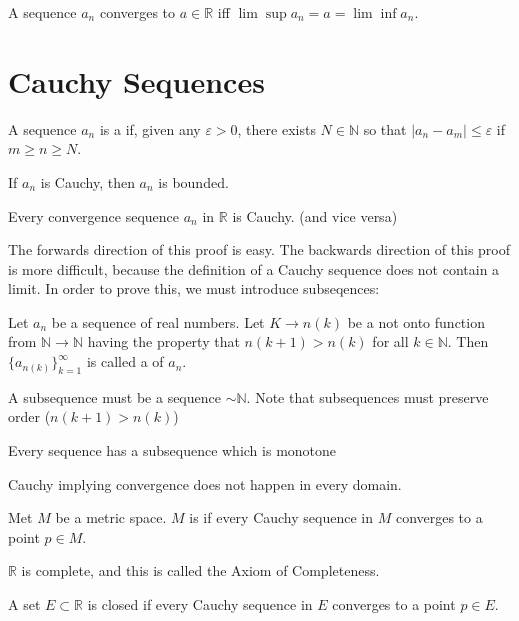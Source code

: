 \begin{theorem}
A sequence $a_n$ converges to $a \in \mathbb{R}$ iff $\lim\sup a_n = a = \lim\inf a_n$. 
\end{theorem}
\section{Cauchy Sequences}
\begin{definition}
A sequence $a_n$ is a  if, given any $\varepsilon > 0$, there exists $N \in \mathbb{N}$ so that $|a_n - a_m| \leq \varepsilon$ if $m \geq n \geq N$. 
\end{definition}
\begin{proposition*}
If $a_n$ is Cauchy, then $a_n$ is bounded. 
\end{proposition*}
\begin{theorem}
Every convergence sequence $a_n$ in $\mathbb{R}$ is Cauchy. (and vice versa)
\end{theorem}
The forwards direction of this proof is easy. The backwards direction of this proof is more difficult, because the definition of a Cauchy sequence does not contain a limit. In order to prove this, we must introduce subseqences:
\begin{definition}
Let $a_n$ be a sequence of real numbers. Let $K \rightarrow n(k)$ be a not onto function from $\mathbb{N} \longrightarrow \mathbb{N}$ having the property that $n(k+1)>n(k)$ for all $k \in \mathbb{N}$. Then $\{a_{n(k)}\}_{k=1}^\infty$ is called a  of $a_n$. 
\end{definition}
\begin{remark}
A subsequence must be a sequence $\sim \mathbb{N}$. Note that subsequences must preserve order ($n(k+1) > n(k)$)
\end{remark}
\begin{theorem}
Every sequence has a subsequence which is monotone
\end{theorem}
Cauchy implying convergence does not happen in every domain. 
\begin{definition}
Met $M$ be a metric space. $M$ is  if every Cauchy sequence in $M$ converges to a point $p \in M$. 
\end{definition}
$\mathbb{R}$ is complete, and this is called the Axiom of Completeness. 
\begin{theorem}
A set $E \subset \mathbb{R}$ is closed if every Cauchy sequence in $E$ converges to a point $p \in E$. 
\end{theorem}
